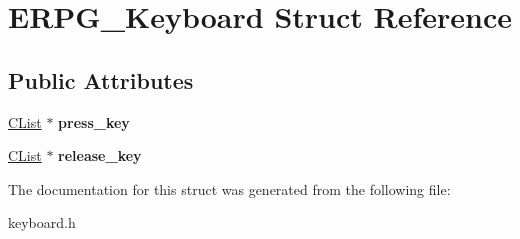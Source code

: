 \hypertarget{structERPG__Keyboard}{\section{E\-R\-P\-G\-\_\-\-Keyboard Struct Reference}
\label{structERPG__Keyboard}
}
\subsection*{Public Attributes}
\begin{DoxyCompactItemize}
\item 
\hypertarget{structERPG__Keyboard_a2fc88540e525a8920c4f110302109f6c}{\hyperlink{structCList}{C\-List} $\ast$ {\bfseries press\-\_\-key}}\label{structERPG__Keyboard_a2fc88540e525a8920c4f110302109f6c}

\item 
\hypertarget{structERPG__Keyboard_ab2cce0055024344c21df891598473984}{\hyperlink{structCList}{C\-List} $\ast$ {\bfseries release\-\_\-key}}\label{structERPG__Keyboard_ab2cce0055024344c21df891598473984}

\end{DoxyCompactItemize}


The documentation for this struct was generated from the following file\-:\begin{DoxyCompactItemize}
\item 
keyboard.\-h\end{DoxyCompactItemize}
